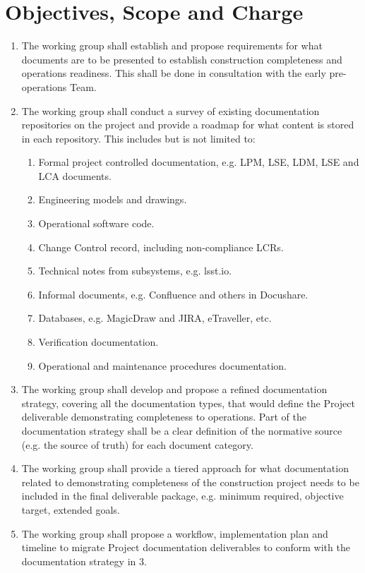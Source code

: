 \documentclass[SE,authoryear,toc]{lsstdoc}
\begin{document}
\section{Objectives, Scope and Charge}
\begin{enumerate}
\item The working group shall establish and propose requirements for what documents are to be presented to establish construction completeness and operations readiness.  This shall be done in consultation with the early pre-operations Team.
\item  The working group shall conduct a survey of existing documentation repositories on the project and provide a roadmap for what content is stored in each repository.  This includes but is not limited to:
	\begin{enumerate}
    		\item Formal project controlled documentation, e.g. LPM, LSE, LDM, LSE and LCA documents.
    		\item Engineering models and drawings.
    		\item Operational software code.
   		\item Change Control record, including non-compliance LCRs.
    		\item Technical notes from subsystems, e.g. lsst.io.
    		\item Informal documents, e.g. Confluence and others in Docushare.
    		\item Databases, e.g. MagicDraw and JIRA, eTraveller, etc. 
    		\item Verification documentation.
    		\item Operational and maintenance procedures documentation.
	\end{enumerate} 
\item {The working group shall develop and propose a refined documentation strategy, covering all the documentation types, that would define the Project deliverable demonstrating completeness to operations.
Part of the documentation strategy shall be a clear definition of the normative source (e.g. the source of truth) for each document category.}
\item {The working group shall provide a tiered approach for what documentation related to demonstrating completeness of the construction project needs to be included in the final deliverable package, e.g. minimum required, objective target, extended goals.}
\item{The working group shall propose a workflow, implementation plan and timeline to migrate Project documentation deliverables to conform with the documentation strategy in 3. 
}
\end{enumerate}
\end{document}
